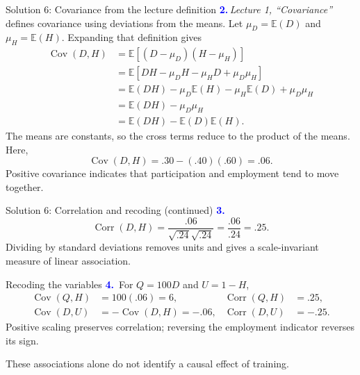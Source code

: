 \documentclass[notes,10pt, aspectratio=169]{beamer}
\newcommand{\E}{\mathbb{E}}
\newcommand{\Cov}{\operatorname{Cov}}
\newcommand{\Corr}{\operatorname{Corr}}
\newcommand{\answerpart}[1]{\textcolor{blue}{\textbf{#1.}}\,}
\begin{document}
\begin{frame}{Solution 6: Covariance from the lecture definition}
\small
\answerpart{2}\textit{Lecture 1, ``Covariance''} defines covariance using deviations from the means. Let $\mu_D=\E(D)$ and $\mu_H=\E(H)$. Expanding that definition gives
\begin{align*}
\Cov(D,H)
&=\E[(D-\mu_D)(H-\mu_H)]\\
&=\E[DH-\mu_D H-\mu_H D+\mu_D\mu_H]\\
&=\E(DH)-\mu_D\E(H)-\mu_H\E(D)+\mu_D\mu_H\\
&=\E(DH)-\mu_D\mu_H\\
&=\E(DH)-\E(D)\E(H).
\end{align*}
The means are constants, so the cross terms reduce to the product of the means. Here,
\[
\Cov(D,H)=.30-(.40)(.60)=\boxed{.06}.
\]
Positive covariance indicates that participation and employment tend to move together.
\end{frame}

\begin{frame}{Solution 6: Correlation and recoding (continued)}
\small
\answerpart{3}
\[
\Corr(D,H)=\frac{.06}{\sqrt{.24}\sqrt{.24}}=\frac{.06}{.24}=\boxed{.25}.
\]
Dividing by standard deviations removes units and gives a scale-invariant measure of linear association.
\begin{block}{Recoding the variables}
\answerpart{4}
For $Q=100D$ and $U=1-H$,
\begin{align*}
\Cov(Q,H)&=100(.06)=6, &\Corr(Q,H)&=.25,\\
\Cov(D,U)&=-\Cov(D,H)=-.06, &\Corr(D,U)&=-.25.
\end{align*}
Positive scaling preserves correlation; reversing the employment indicator reverses its sign.
\end{block}
These associations alone do not identify a causal effect of training.
\end{frame}
\fi
\end{document}

